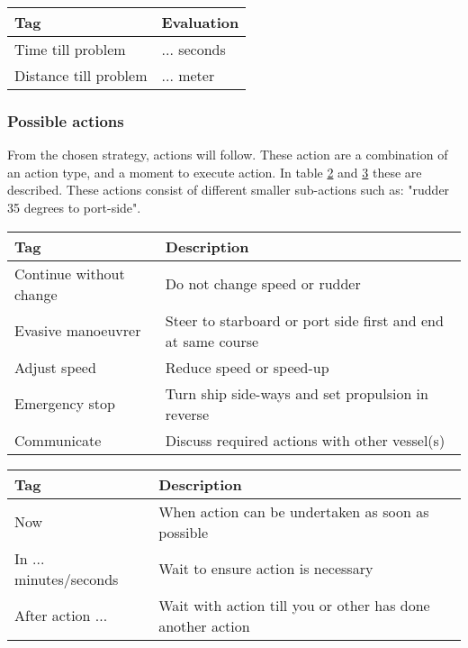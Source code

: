 \begin{table}[H]
	\begin{tabular}{p{}|p{}}
		\toprule
		Tag & Evaluation \\
		\midrule
		Time till problem & ... seconds\\
		Distance till problem & ... meter \\
		\bottomrule
	\end{tabular}
	
	\label{tab:manoeuvre-criteria}
\end{table}

\subsubsection{Possible actions}
From the chosen strategy, actions will follow. These action are a combination of an action type, and a moment to execute action. In table \ref{tab:actions} and \ref{tab:time-domain-action} these are described. These actions consist of different smaller sub-actions such as: "rudder 35 degrees to port-side". 
\begin{table}[H]
	\begin{tabular}{p{}|p{}}
		\toprule
		Tag & Description\\
		\midrule
		Continue without change & Do not change speed or rudder\\
		Evasive manoeuvrer & Steer to starboard or port side first and end at same course\\
		Adjust speed & Reduce speed or speed-up \\
		Emergency stop & Turn ship side-ways and set propulsion in reverse\\
		Communicate & Discuss required actions with other vessel(s)\\
		\bottomrule
	\end{tabular}
	
	\label{tab:actions}
\end{table}

\begin{table}[H]
	\begin{tabular}{p{}|p{}}
		\toprule
		Tag & Description\\
		\midrule
		Now & When action can be undertaken as soon as possible \\
		In ... minutes/seconds & Wait to ensure action is necessary \\
		After action ... & Wait with action till you or other has done another action \\
		\bottomrule
	\end{tabular}
	
	\label{tab:time-domain-action}
\end{table}

